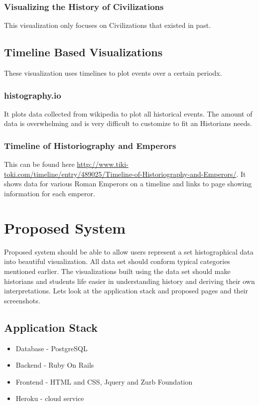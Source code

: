 \subsection{Visualizing the History of Civilizations}
This visualization only focuses on Civilizations that existed in past.

\section{Timeline Based Visualizations}
These visualization uses timelines to plot events over a certain periodx.
\subsection{histography.io}
It plots data collected from wikipedia to plot all historical events. The amount of data is overwhelming and is very difficult to customize to fit an Historians needs.
\subsection{Timeline of Historiography and Emperors}
This can be found here \url{http://www.tiki-toki.com/timeline/entry/489025/Timeline-of-Historiography-and-Emperors/}. It shows data for various Roman Emperors on a timeline and links to page showing information for each emperor.

\chapter{Proposed System}
Proposed system should be able to allow users represent a set histographical data into beautiful visualization. All data set should conform typical categories mentioned earlier. The visualizations built using the data set should make historians and students life easier in understanding history and deriving their own interpretations. Lets look at the application stack and proposed pages and their screenshots.
\section{Application Stack}
\begin{itemize}
  \item Database - PostgreSQL
  \item Backend - Ruby On Rails
  \item Frontend - HTML and CSS, Jquery and Zurb Foundation
  \item Heroku - cloud service
\end{itemize}

